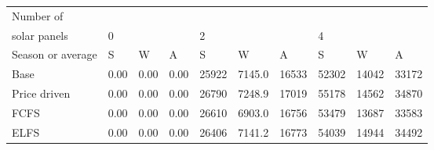 \begin{table}[h] 
\centering 
\begin{tabular}{l|lll|lll|lll}Number of \\ solar panels&0& & &2& & &4& & \\ \hline 
Season or average & S & W & A & S & W & A & S & W & A \\ \hline 
Base&0.00&0.00&0.00&25922&7145.0&16533&52302&14042&33172 \\ 
Price driven&0.00&0.00&0.00&26790&7248.9&17019&55178&14562&34870 \\ 
FCFS&0.00&0.00&0.00&26610&6903.0&16756&53479&13687&33583 \\ 
ELFS&0.00&0.00&0.00&26406&7141.2&16773&54039&14944&34492 \\ 
\end{tabular} 
\end{table}